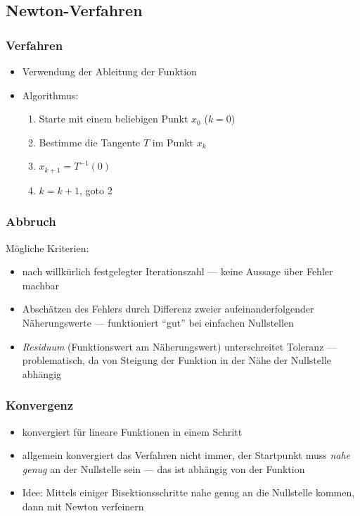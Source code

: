 \documentclass[a4paper, 12pt]{article}
\begin{document}
\subsection{Newton-Verfahren}

\subsubsection*{Verfahren}
\begin{itemize}
  \item Verwendung der Ableitung der Funktion
  \item Algorithmus:
    \begin{enumerate}
      \item Starte mit einem beliebigen Punkt \(x_0\) (\(k=0\))
      \item Bestimme die Tangente \(T\) im Punkt \(x_k\)
      \item \(x_{k+1} = T^{-1}(0)\)
      \item \(k=k+1\), goto 2
    \end{enumerate}
\end{itemize}

\subsubsection*{Abbruch}
Mögliche Kriterien:
\begin{itemize}
  \item nach willkürlich festgelegter Iterationszahl --- keine Aussage über Fehler machbar
  \item Abschätzen des Fehlers durch Differenz zweier aufeinanderfolgender Näherungswerte --- funktioniert ``gut'' bei einfachen Nullstellen
  \item \emph{Residuum} (Funktionswert am Näherungswert) unterschreitet Toleranz --- problematisch, da von Steigung der Funktion in der Nähe der Nullstelle abhängig
\end{itemize}

\subsubsection*{Konvergenz}
\begin{itemize}
  \item konvergiert für lineare Funktionen in einem Schritt
  \item allgemein konvergiert das Verfahren nicht immer, der Startpunkt muss \emph{nahe genug} an der Nullstelle sein --- das ist abhängig von der Funktion
  \item Idee: Mittels einiger Bisektionsschritte nahe genug an die Nullstelle kommen, dann mit Newton verfeinern
\end{itemize}
\end{document}
